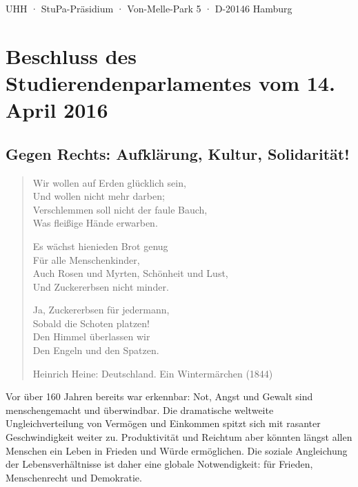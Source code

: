\documentclass[ngerman,headheight=70pt]{scrartcl}
\begin{document}
    UHH · StuPa-Präsidium · Von-Melle-Park 5 · D-20146 Hamburg

    \section*{Beschluss des Studierendenparlamentes vom 14. April 2016}
    \subsection*{Gegen Rechts: Aufklärung, Kultur, Solidarität!}

    \blockquote[Heinrich Heine: Deutschland. Ein Wintermärchen (1844)]{
        Wir wollen auf Erden glücklich sein,\\
        Und wollen nicht mehr darben;\\
        Verschlemmen soll nicht der faule Bauch,\\
        Was fleißige Hände erwarben.

        Es wächst hienieden Brot genug\\
        Für alle Menschenkinder,\\
        Auch Rosen und Myrten, Schönheit und Lust,\\
        Und Zuckererbsen nicht minder.

        Ja, Zuckererbsen für jedermann,\\
        Sobald die Schoten platzen!\\
        Den Himmel überlassen wir\\
        Den Engeln und den Spatzen.\\
    }

	Vor über 160 Jahren bereits war erkennbar: Not, Angst und Gewalt sind
    menschengemacht und überwindbar. Die dramatische weltweite Ungleichverteilung
    von Vermögen und Einkommen spitzt sich mit rasanter Geschwindigkeit weiter zu.
    Produktivität und Reichtum aber könnten längst allen Menschen ein Leben in
    Frieden und Würde ermöglichen. Die soziale Angleichung der Lebensverhältnisse ist
	daher eine globale Notwendigkeit: für Frieden, Menschenrecht und Demokratie.
\end{document}
